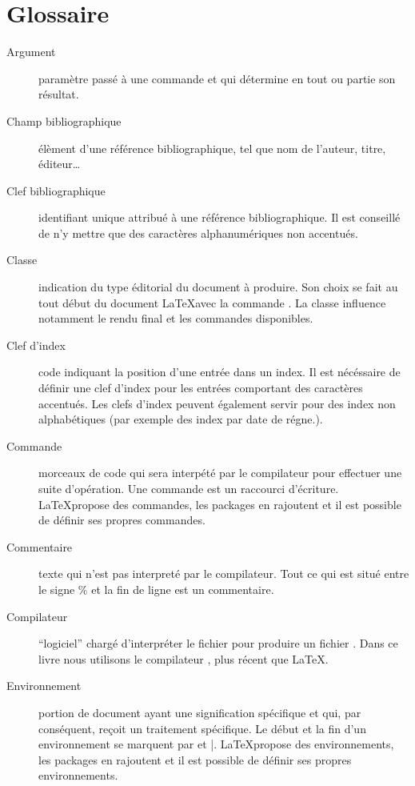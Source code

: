 \chapter{Glossaire}


\begin{description}
\item[Argument] paramètre passé à une commande et qui détermine en tout ou partie son résultat.


\item[Champ bibliographique]élèment d'une référence bibliographique, tel que nom de l'auteur, titre, éditeur…

\item[Clef bibliographique]identifiant unique attribué à une référence bibliographique. Il est conseillé de n'y mettre que des caractères alphanumériques non accentués.

\item[Classe]indication du type éditorial du document à produire. Son choix se fait au tout début du document \LaTeX avec la commande . La classe influence notamment le rendu final et les commandes disponibles.

\item[Clef d'index] code indiquant la position d'une entrée dans un index. Il est nécéssaire de définir une clef d'index pour les entrées comportant des caractères accentués. Les clefs d'index peuvent également servir pour des index non alphabétiques (par exemple des index par date de régne.).

\item[Commande] morceaux de code qui sera interpété par le compilateur pour effectuer une suite d'opération. Une commande est un raccourci d'écriture. \LaTeX propose des commandes, les packages en rajoutent et il est possible de définir ses propres commandes.

\item[Commentaire] texte qui n'est pas interpreté par le compilateur. Tout ce qui est situé entre le signe \% et la fin de ligne est un commentaire.

\item[Compilateur]\enquote{logiciel} chargé d'interpréter le fichier  pour produire un fichier . Dans ce livre nous utilisons le compilateur \XeLaTeX, plus récent que \LaTeX.

\item[Environnement]portion de document ayant une signification spécifique et qui, par conséquent, reçoit un traitement spécifique. Le début et la fin d'un environnement se marquent par  et |. \LaTeX propose des environnements, les packages en rajoutent et il est possible de définir ses propres environnements.


\end{description}

